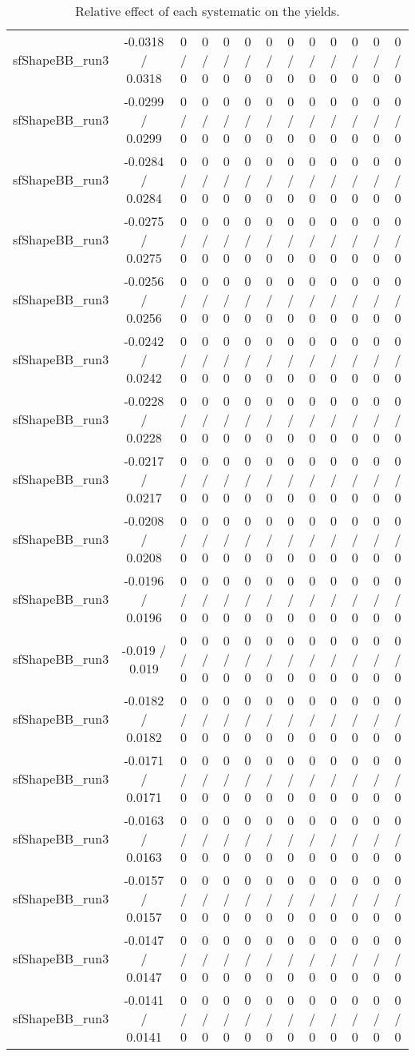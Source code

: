 \documentclass[10pt]{article}
\begin{document}
\begin{table}[htbp]
\begin{center}
\begin{tabular}{|c|c|c|c|c|c|c|c|c|c|c|c|c|}
  sfShapeBB_run3 & -0.0318 / 0.0318 & 0 / 0 & 0 / 0 & 0 / 0 & 0 / 0 & 0 / 0 & 0 / 0 & 0 / 0 & 0 / 0 & 0 / 0 & 0 / 0 & 0 / 0 \\ 
  sfShapeBB_run3 & -0.0299 / 0.0299 & 0 / 0 & 0 / 0 & 0 / 0 & 0 / 0 & 0 / 0 & 0 / 0 & 0 / 0 & 0 / 0 & 0 / 0 & 0 / 0 & 0 / 0 \\ 
  sfShapeBB_run3 & -0.0284 / 0.0284 & 0 / 0 & 0 / 0 & 0 / 0 & 0 / 0 & 0 / 0 & 0 / 0 & 0 / 0 & 0 / 0 & 0 / 0 & 0 / 0 & 0 / 0 \\ 
  sfShapeBB_run3 & -0.0275 / 0.0275 & 0 / 0 & 0 / 0 & 0 / 0 & 0 / 0 & 0 / 0 & 0 / 0 & 0 / 0 & 0 / 0 & 0 / 0 & 0 / 0 & 0 / 0 \\ 
  sfShapeBB_run3 & -0.0256 / 0.0256 & 0 / 0 & 0 / 0 & 0 / 0 & 0 / 0 & 0 / 0 & 0 / 0 & 0 / 0 & 0 / 0 & 0 / 0 & 0 / 0 & 0 / 0 \\ 
  sfShapeBB_run3 & -0.0242 / 0.0242 & 0 / 0 & 0 / 0 & 0 / 0 & 0 / 0 & 0 / 0 & 0 / 0 & 0 / 0 & 0 / 0 & 0 / 0 & 0 / 0 & 0 / 0 \\ 
  sfShapeBB_run3 & -0.0228 / 0.0228 & 0 / 0 & 0 / 0 & 0 / 0 & 0 / 0 & 0 / 0 & 0 / 0 & 0 / 0 & 0 / 0 & 0 / 0 & 0 / 0 & 0 / 0 \\ 
  sfShapeBB_run3 & -0.0217 / 0.0217 & 0 / 0 & 0 / 0 & 0 / 0 & 0 / 0 & 0 / 0 & 0 / 0 & 0 / 0 & 0 / 0 & 0 / 0 & 0 / 0 & 0 / 0 \\ 
  sfShapeBB_run3 & -0.0208 / 0.0208 & 0 / 0 & 0 / 0 & 0 / 0 & 0 / 0 & 0 / 0 & 0 / 0 & 0 / 0 & 0 / 0 & 0 / 0 & 0 / 0 & 0 / 0 \\ 
  sfShapeBB_run3 & -0.0196 / 0.0196 & 0 / 0 & 0 / 0 & 0 / 0 & 0 / 0 & 0 / 0 & 0 / 0 & 0 / 0 & 0 / 0 & 0 / 0 & 0 / 0 & 0 / 0 \\ 
  sfShapeBB_run3 & -0.019 / 0.019 & 0 / 0 & 0 / 0 & 0 / 0 & 0 / 0 & 0 / 0 & 0 / 0 & 0 / 0 & 0 / 0 & 0 / 0 & 0 / 0 & 0 / 0 \\ 
  sfShapeBB_run3 & -0.0182 / 0.0182 & 0 / 0 & 0 / 0 & 0 / 0 & 0 / 0 & 0 / 0 & 0 / 0 & 0 / 0 & 0 / 0 & 0 / 0 & 0 / 0 & 0 / 0 \\ 
  sfShapeBB_run3 & -0.0171 / 0.0171 & 0 / 0 & 0 / 0 & 0 / 0 & 0 / 0 & 0 / 0 & 0 / 0 & 0 / 0 & 0 / 0 & 0 / 0 & 0 / 0 & 0 / 0 \\ 
  sfShapeBB_run3 & -0.0163 / 0.0163 & 0 / 0 & 0 / 0 & 0 / 0 & 0 / 0 & 0 / 0 & 0 / 0 & 0 / 0 & 0 / 0 & 0 / 0 & 0 / 0 & 0 / 0 \\ 
  sfShapeBB_run3 & -0.0157 / 0.0157 & 0 / 0 & 0 / 0 & 0 / 0 & 0 / 0 & 0 / 0 & 0 / 0 & 0 / 0 & 0 / 0 & 0 / 0 & 0 / 0 & 0 / 0 \\ 
  sfShapeBB_run3 & -0.0147 / 0.0147 & 0 / 0 & 0 / 0 & 0 / 0 & 0 / 0 & 0 / 0 & 0 / 0 & 0 / 0 & 0 / 0 & 0 / 0 & 0 / 0 & 0 / 0 \\ 
  sfShapeBB_run3 & -0.0141 / 0.0141 & 0 / 0 & 0 / 0 & 0 / 0 & 0 / 0 & 0 / 0 & 0 / 0 & 0 / 0 & 0 / 0 & 0 / 0 & 0 / 0 & 0 / 0 \\ 
\hline 
\end{tabular} 
\caption{Relative effect of each systematic on the yields.} 
\end{center} 
\end{table} 
\end{document}

